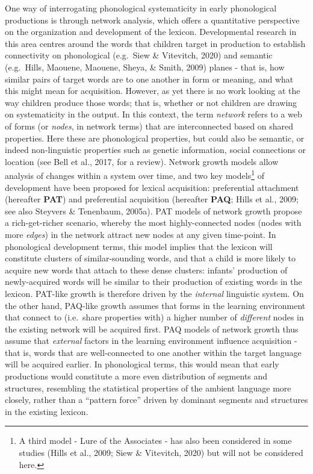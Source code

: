 \documentclass[
  english,
  man,floatsintext]{apa6}
\begin{document}
One way of interrogating phonological systematicity in early phonological productions is through network analysis, which offers a quantitative perspective on the organization and development of the lexicon. Developmental research in this area centres around the words that children target in production to establish connectivity on phonological (e.g.~Siew \& Vitevitch, 2020) and semantic (e.g.~Hills, Maouene, Maouene, Sheya, \& Smith, 2009) planes - that is, how similar pairs of target words are to one another in form or meaning, and what this might mean for acquisition. However, as yet there is no work looking at the way children produce those words; that is, whether or not children are drawing on systematicity in the output. In this context, the term \emph{network} refers to a web of forms (or \emph{nodes}, in network terms) that are interconnected based on shared properties. Here these are phonological properties, but could also be semantic, or indeed non-linguistic properties such as genetic information, social connections or location (see Bell et al., 2017, for a review). Network growth models allow analysis of changes within a system over time, and two key models\footnote{A third model - Lure of the Associates - has also been considered in some studies (Hills et al., 2009; Siew \& Vitevitch, 2020) but will not be considered here.} of development have been proposed for lexical acquisition: preferential attachment (hereafter \textbf{PAT}) and preferential acquisition (hereafter \textbf{PAQ}; Hills et al., 2009; see also Steyvers \& Tenenbaum, 2005a). PAT models of network growth propose a rich-get-richer scenario, whereby the most highly-connected nodes (nodes with more \emph{edges}) in the network attract new nodes at any given time-point. In phonological development terms, this model implies that the lexicon will constitute clusters of similar-sounding words, and that a child is more likely to acquire new words that attach to these dense clusters: infants' production of newly-acquired words will be similar to their production of existing words in the lexicon. PAT-like growth is therefore driven by the \emph{internal} linguistic system. On the other hand, PAQ-like growth assumes that forms in the learning environment that connect to (i.e.~share properties with) a higher number of \emph{different} nodes in the existing network will be acquired first. PAQ models of network growth thus assume that \emph{external} factors in the learning environment influence acquisition - that is, words that are well-connected to one another within the target language will be acquired earlier. In phonological terms, this would mean that early productions would constitute a more even distribution of segments and structures, resembling the statistical properties of the ambient language more closely, rather than a \enquote{pattern force} driven by dominant segments and structures in the existing lexicon.
\end{document}
